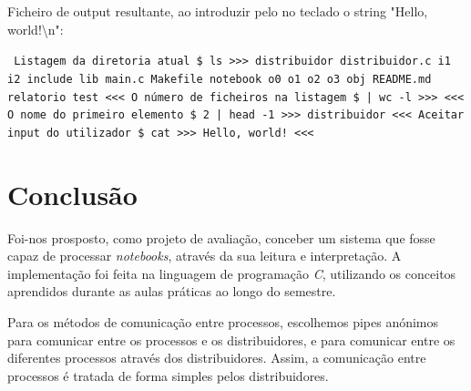 \documentclass[12pt]{report}
\newcommand\tab[1][0.5cm]{\hspace*{#1}}
\begin{document}
\noindent Ficheiro de output resultante, ao introduzir pelo no teclado o string "Hello, world!\textbackslash n":

\texttt{
\newline Listagem da diretoria atual
\newline \$ ls
\newline >>>
\newline distribuidor \newline distribuidor.c \newline i1 \newline i2
\newline include \newline lib \newline main.c \newline Makefile
\newline notebook \newline o0 \newline o1 \newline o2 \newline o3
\newline obj \newline README.md \newline relatorio \newline test
\newline <<<
\newline O número de ficheiros na listagem
\newline \$ | wc -l
\newline >>>
\newline <<<
\newline O nome do primeiro elemento
\newline \$ 2 | head -1
\newline >>>
\newline distribuidor
\newline <<<
\newline Aceitar input do utilizador
\newline \$ cat
\newline >>>
\newline Hello, world!
\newline <<<
\newline
}

\chapter{Conclusão}
\label{sec:conclusao}

\tab Foi-nos prosposto, como projeto de avaliação, conceber um sistema que fosse capaz de processar \textit{notebooks}, através da sua leitura e  interpretação. A implementação foi feita na linguagem de programação \textit{C}, utilizando os conceitos aprendidos durante as aulas práticas ao longo do semestre. 

Para os métodos de comunicação entre processos, escolhemos pipes anónimos para comunicar entre os processos e os distribuidores, e  para comunicar entre os diferentes processos através dos distribuidores. Assim, a comunicação entre processos é tratada de forma simples pelos distribuidores.
\end{document}
